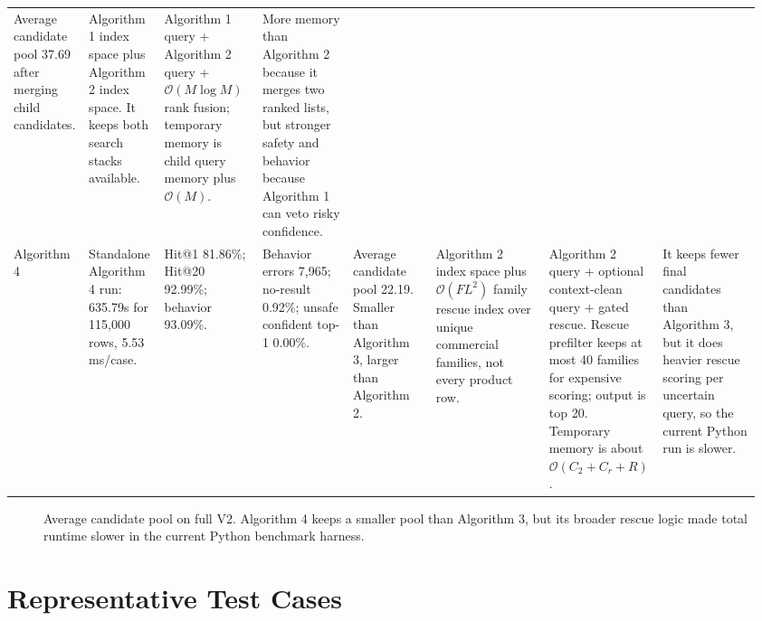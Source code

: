 \documentclass[11pt]{article}
\newcommand{\bigO}{\mathcal{O}}
\begin{document}
\begin{landscape}
\begin{longtable}{@{}L{0.07\linewidth}L{0.10\linewidth}L{0.13\linewidth}L{0.12\linewidth}L{0.11\linewidth}L{0.15\linewidth}L{0.15\linewidth}L{0.13\linewidth}@{}}
Average candidate pool 37.69 after merging child candidates. &
Algorithm 1 index space plus Algorithm 2 index space. It keeps both search stacks available. &
Algorithm 1 query + Algorithm 2 query + \(\bigO(M\log M)\) rank fusion; temporary memory is child query memory plus \(\bigO(M)\). &
More memory than Algorithm 2 because it merges two ranked lists, but stronger safety and behavior because Algorithm 1 can veto risky confidence. \\
Algorithm 4 &
Standalone Algorithm 4 run: 635.79s for 115,000 rows, 5.53 ms/case. &
Hit@1 81.86\%; Hit@20 92.99\%; behavior 93.09\%. &
Behavior errors 7,965; no-result 0.92\%; unsafe confident top-1 0.00\%. &
Average candidate pool 22.19. Smaller than Algorithm 3, larger than Algorithm 2. &
Algorithm 2 index space plus \(\bigO(FL^2)\) family rescue index over unique commercial families, not every product row. &
Algorithm 2 query + optional context-clean query + gated rescue. Rescue prefilter keeps at most 40 families for expensive scoring; output is top 20. Temporary memory is about \(\bigO(C_2 + C_r + R)\). &
It keeps fewer final candidates than Algorithm 3, but it does heavier rescue scoring per uncertain query, so the current Python run is slower. \\
\bottomrule
\end{longtable}
\setlength{\tabcolsep}{6pt}
\normalsize
\end{landscape}

\begin{figure}[H]
\centering
{}
\caption{Average candidate pool on full V2. Algorithm 4 keeps a smaller pool
than Algorithm 3, but its broader rescue logic made total runtime slower in the
current Python benchmark harness.}
\end{figure}

\section{Representative Test Cases}
\end{document}

